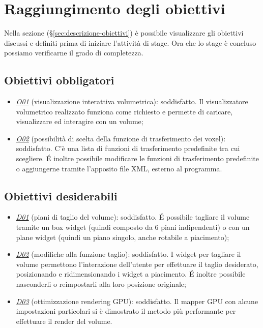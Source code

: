 \section{Raggiungimento degli obiettivi}
Nella sezione  (§\ref{sec:descrizione-obiettivi}) è possibile visualizzare gli obiettivi discussi e definiti prima di iniziare l'attività di stage. Ora che lo stage è concluso possiamo verificarne il grado di completezza.

\subsection{Obiettivi obbligatori}
\begin{itemize}
\item \underline{\textit{O01}} (visualizzazione interattiva volumetrica): soddisfatto. Il visualizzatore volumetrico realizzato funziona come richiesto e permette di caricare, visualizzare ed interagire con un volume;
\item \underline{\textit{O02}} (possibilità di scelta della funzione di trasferimento dei voxel): soddisfatto. C'è una lista di funzioni di trasferimento predefinite tra cui scegliere. \'E inoltre possibile modificare le funzioni di trasferimento predefinite o aggiungerne tramite l'apposito file XML, esterno al programma.
\end{itemize}

\subsection{Obiettivi desiderabili}
\begin{itemize}
\item \underline{\textit{D01}} (piani di taglio del volume): soddisfatto. \'E possibile tagliare il volume tramite un box widget (quindi composto da 6 piani indipendenti) o con un plane widget (quindi un piano singolo, anche rotabile a piacimento);
\item \underline{\textit{D02}} (modifiche alla funzione taglio): soddisfatto. I widget per tagliare il volume permettono l'interazione dell'utente per effettuare il taglio desiderato, posizionando e ridimensionando i widget a piacimento. \'E inoltre possibile nasconderli o reimpostarli alla loro posizione originale;
\item \underline{\textit{D03}} (ottimizzazione rendering GPU): soddisfatto. Il mapper GPU con alcune impostazioni particolari si è dimostrato il metodo più performante per effettuare il render del volume.
\end{itemize}

